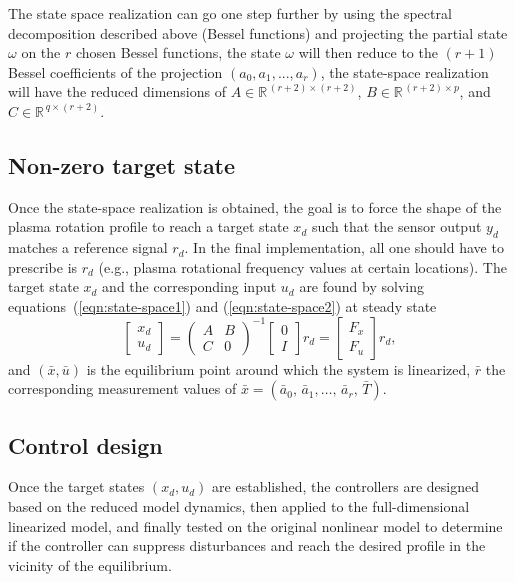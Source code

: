 \documentclass[12pt]{iopart}
\begin{document}
The state space realization can go one step further by using the spectral decomposition described above (Bessel functions) and projecting the partial state $ \omega$ on the $r$ chosen Bessel functions, the state $ \omega$ will then reduce to the $(r+1)$ Bessel coefficients of the projection $(a_{0}, a_{1}, ..., a_{r})$, the state-space realization will have the reduced dimensions of $A \in \mathbb{R}^{\, (r+2) \times (r+2)}$, $B \in \mathbb{R}^{\,(r+2) \times p}$, and $C \in \mathbb{R}^{\, q \times (r+2)}$.

\subsection{Non-zero target state}
Once the state-space realization is obtained, the goal is to force the shape of the plasma rotation profile to reach a target state $x_d$ such that the sensor output $y_d$ matches a reference signal $r_d$. In the final implementation, all one should have to prescribe is $r_d$ (e.g., plasma rotational frequency values at certain locations). The target state $x_d$ and the corresponding input $u_d$ are found by solving equations~(\ref{eqn:state-space1}) and (\ref{eqn:state-space2}) at steady state
\begin{equation}
\left[\! \begin{array}{c}  x_{d} \\ u_{d}\end{array}\!\right]
  ={ \left(\! \begin{array}{cc} A  & B \\ C & 0 \end{array} \! \right)}^{-1} \left[\! \begin{array}{c} 0 \\ I    \end{array}  \!\right] r_{d} = \left[\! \begin{array}{c} F_x \\ F_u    \end{array}  \!\right] r_{d},
\label{steadystate}
\end{equation}
and $\left( \bar{x}, \bar{u}  \right)$ is the equilibrium point around which the system is linearized, $\bar{r}$ the corresponding measurement values of $\bar{x} = \left( \bar{a}_{0},\, \bar{a}_{1},\ldots,\, \bar{a}_{r},\,\bar{T} \right)$. 
 
\subsection{Control design} 
Once the target states $\left( x_{d} , u_{d} \right)$ are established, the controllers are designed based on the reduced model dynamics, then applied to the full-dimensional linearized model, and finally tested on the original nonlinear model to determine if the controller can suppress disturbances and reach the desired profile in the vicinity of the equilibrium.
\end{document}
